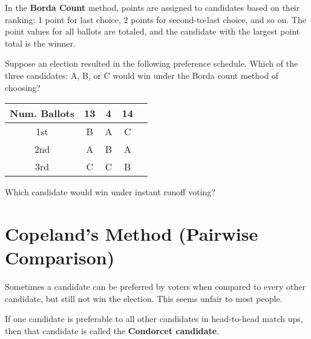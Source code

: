 \begin{definition}
  In the \textbf{Borda Count} method, points are assigned to
  candidates based on their ranking; 1 point for last choice, 2 points
  for second-to-last choice, and so on. The point values for all
  ballots are totaled, and the candidate with the largest point total
  is the winner.
\end{definition}

\begin{exercise}\label{ex:borda-count}
  Suppose an election resulted in the following preference schedule.
  Which of the three candidates: A, B, or C would win under the Borda
  count method of choosing?
  \begin{center}
    \begin{tabular}{ccccc}
      \toprule
      Num. Ballots & 13 & 4 & 14 \\
      \midrule
      1st & B & A & C \\
      2nd & A & B & A \\
      3rd & C & C & B \\
      \bottomrule
    \end{tabular}
  \end{center}

\end{exercise}

\begin{exercise}\label{ex:irv}
  Which candidate would win under instant runoff voting?

\end{exercise}

\newpage

\section{Copeland's Method (Pairwise Comparison)}%
\label{sec:copelands-method}

Sometimes a candidate can be preferred by voters when compared to
every other candidate, but still not win the election. This seems
unfair to most people.

\begin{definition}
  If one candidate is preferable to all other candidates in
  head-to-head match ups, then that candidate is called the
  \textbf{Condorcet candidate}.
\end{definition}

